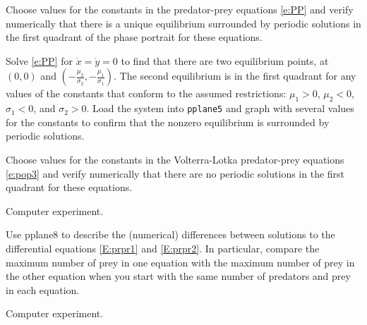 \documentclass{ximera}
\begin{document}
\CEXER

\begin{exercise} \label{c9.1.3}
Choose values for the constants in the predator-prey equations 
\eqref{e:PP} and verify numerically that there is a unique 
equilibrium surrounded by periodic solutions in the first 
quadrant of the phase portrait for these equations.

\begin{solution}

Solve \eqref{e:PP} for $\dot{x} = \dot{y} = 0$ to find that there are
two equilibrium points, at $(0,0)$ and $(-\frac{\mu_2}{\sigma_2},
-\frac{\mu_1}{\sigma_1})$.  The second equilibrium is in the first
quadrant for any values of the constants that conform to the assumed
restrictions: $\mu_1 > 0$, $\mu_2 < 0$, $\sigma_1 < 0$, and
$\sigma_2 > 0$.  Load the system into {\tt pplane5} and graph with
several values for the constants to confirm that the nonzero
equilibrium is surrounded by periodic solutions.

\end{solution}
\end{exercise}

\begin{exercise} \label{c9.1.4}
Choose values for the constants in the Volterra-Lotka predator-prey equations 
\eqref{e:pop3} and verify numerically that there are no periodic solutions in 
the first quadrant for these equations.

\begin{solution}
Computer experiment.

\end{solution}
\end{exercise}

\begin{exercise} \label{c9.1.7}
Use {\sf pplane8} to describe the (numerical) differences between solutions 
to the differential equations \eqref{E:prpr1} and \eqref{E:prpr2}.  In particular,
compare the maximum number of prey in one equation with the maximum number of 
prey in the other equation when you start with the same number of predators 
and prey in each equation.

\begin{solution}
Computer experiment.


\end{solution}
\end{exercise}
\end{document}
